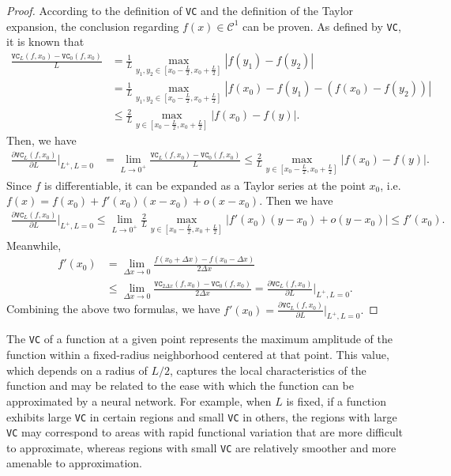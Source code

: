 \documentclass[final]{siamart220329}
\newtheorem{theoretical insights}{Theoretical insights}
\newtheorem{practical takeaway}{Practical takeaway}
\begin{document}
\begin{proof}
According to the definition of \texttt{VC} and the definition of the Taylor expansion, the conclusion regarding $f(x)\in\mathcal{C}^1$ can be  proven. As defined by \texttt{VC}, it is known that
\[\begin{aligned}
\frac{\texttt{VC}_L(f,x_0)-\texttt{VC}_0(f,x_0)}{L}
&=\frac{1}{L}\max_{y_1,y_2\in[x_0-\frac{L}{2},x_0+\frac{L}{2}]}|f(y_1)-f(y_2)|\\
&=\frac{1}{L}\max_{y_1,y_2\in[x_0-\frac{L}{2},x_0+\frac{L}{2}]}|f(x_0)-f(y_1)-(f(x_0)-f(y_2))|\\
&\leq\frac{2}{L}\max_{y\in[x_0-\frac{L}{2},x_0+\frac{L}{2}]}|f(x_0)-f(y)|.
\end{aligned}\]
Then, we have 
\[\begin{aligned}
\frac{\partial\texttt{VC}_L(f,x_0)}{\partial L}\Big|_{L^+,L=0}
&=\lim_{L\rightarrow0^+}\frac{\texttt{VC}_L(f,x_0)-\texttt{VC}_0(f,x_0)}{L} \leq\frac{2}{L}\max_{y\in[x_0-\frac{L}{2},x_0+\frac{L}{2}]}|f(x_0)-f(y)|.
\end{aligned}\]
Since $f$ is differentiable, it can be expanded as a Taylor series at the point $x_0$, i.e. $f(x)=f(x_0)+f'(x_0)(x-x_0)+o(x-x_0)$. Then we have
\[\begin{aligned}
\frac{\partial\texttt{VC}_L(f,x_0)}{\partial L}\Big|_{L^+,L=0} \leq\lim_{L\rightarrow0^+}\frac{2}{L}\max_{y\in[x_0-\frac{L}{2},x_0+\frac{L}{2}]}|f'(x_0)(y-x_0)+o(y-x_0)| \leq f'(x_0).
\end{aligned}\]
Meanwhile, 
\[\begin{aligned}
f'(x_0)&=\lim_{\Delta x\rightarrow0}\frac{f(x_0+\Delta x)-f(x_0-\Delta x)}{2\Delta x}\\
&\leq\lim_{\Delta x\rightarrow0}\frac{\texttt{VC}_{2\Delta x}(f,x_0)-\texttt{VC}_0(f,x_0)}{2\Delta x}=\frac{\partial\texttt{VC}_L(f,x_0)}{\partial L}\Big|_{L^+,L=0}.        
\end{aligned}\]
Combining the above two formulas, we have 
\(
f'(x_0)=\frac{\partial\texttt{VC}_L(f,x_0)}{\partial L}\Big|_{L^+,L=0}.
\)
\end{proof}
 
\begin{remark}
The \texttt{VC} of a function at a given point represents the maximum amplitude of the function within a fixed-radius neighborhood centered at that point. This value, which depends on a radius of $L/2$, captures the local characteristics of the function and may be related to the ease with which the function can be approximated by a neural network. For example, when $L$ is fixed, if a function exhibits large \texttt{VC} in certain regions and small \texttt{VC} in others, the regions with large \texttt{VC} may correspond to areas with rapid functional variation that are more difficult to approximate, whereas regions with small \texttt{VC} are relatively smoother and more amenable to approximation.
\end{remark}
\end{document}
